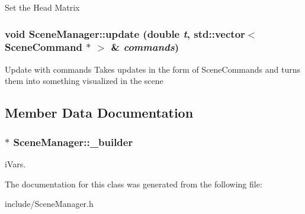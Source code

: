 \label{class_scene_manager_a7e94ed11f1b76b95189c13cdf70a4e6b}
Set the Head Matrix \hypertarget{class_scene_manager_a9d9313b526dfc9c901cd22c98432bdd0}{
\subsubsection[{update}]{\setlength{\rightskip}{0pt plus 5cm}void SceneManager::update (double {\em t}, \/  std::vector$<$ {\bf SceneCommand} $\ast$ $>$ \& {\em commands})}}
\label{class_scene_manager_a9d9313b526dfc9c901cd22c98432bdd0}
Update with commands Takes updates in the form of SceneCommands and turns them into something visualized in the scene 

\subsection{Member Data Documentation}
\hypertarget{class_scene_manager_acb4ad5602b925a2c35f1e46c85a20daa}{
\subsubsection[{\_\-builder}]{$\ast$ {\bf SceneManager::\_\-builder}}}
\label{class_scene_manager_acb4ad5602b925a2c35f1e46c85a20daa}
iVars. 

The documentation for this class was generated from the following file:\begin{DoxyCompactItemize}
\item 
include/SceneManager.h\end{DoxyCompactItemize}

